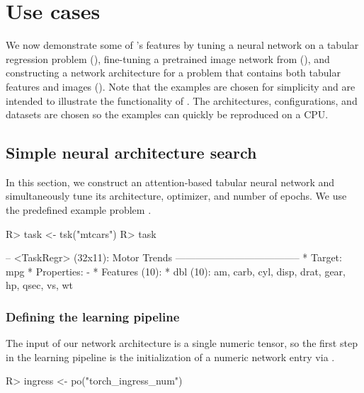 \documentclass[article,shortnames]{jss}
\theoremstyle{definition}
\renewenvironment{CodeChunk}{\par\addvspace{0.6\baselineskip}\noindent\begin{minipage}{\linewidth}}{\end{minipage}\par\vspace{0.6\baselineskip}}
\begin{document}
\section{Use cases}\label{sec:use-cases}

We now demonstrate some of 's features by tuning a neural network on a tabular regression problem (), fine-tuning a pretrained image network from  (), and constructing a network architecture for a problem that contains both tabular features and images ().
Note that the examples are chosen for simplicity and are intended to illustrate the functionality of \mlrttorch{}.
The architectures, configurations, and datasets are chosen so the examples can quickly be reproduced on a CPU.

\subsection{Simple neural architecture search}\label{sec:tuning}

In this section, we construct an attention-based tabular neural network and simultaneously tune its architecture, optimizer, and number of epochs.
We use the predefined  example problem \citep{ref-mtcars}.

\begin{CodeChunk}
\begin{CodeInput}
R> task <- tsk("mtcars")
R> task
\end{CodeInput}
\begin{CodeOutput}
-- <TaskRegr> (32x11): Motor Trends --------------------------------------
* Target: mpg
* Properties: -
* Features (10):
  * dbl (10): am, carb, cyl, disp, drat, gear, hp, qsec, vs, wt
\end{CodeOutput}
\end{CodeChunk}

\subsubsection{Defining the learning pipeline}
The input of our network architecture is a single numeric tensor, so the first step in the learning pipeline is the initialization of a numeric network entry via .

\begin{CodeChunk}
\begin{CodeInput}
R> ingress <- po("torch_ingress_num")
\end{CodeInput}
\end{CodeChunk}
\end{document}
